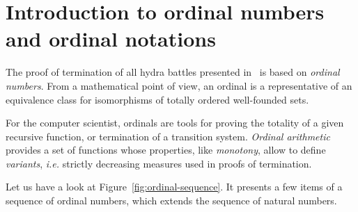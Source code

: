 \chapter{Introduction to ordinal numbers and ordinal notations}
\label{chap:ON}

The proof of termination of all hydra battles presented in~\cite{KP82} is based
on \emph{ordinal numbers}.
From a mathematical point of view, an ordinal is a representative of an equivalence class for isomorphisms of  totally ordered well-founded sets.

For the computer scientist, ordinals are tools for proving the totality of a given recursive function, or termination of a transition system. \emph{Ordinal arithmetic} 
provides a set of functions whose properties, like \emph{monotony}, allow to define \emph{variants}, \emph{i.e.} strictly decreasing measures used in proofs of termination.

\vspace{4pt}

Let us have a look at Figure~\ref{fig:ordinal-sequence}. It presents a few items of a  sequence of ordinal numbers, which extends the sequence of natural numbers. 




